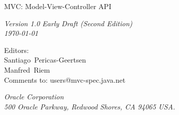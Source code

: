 \begin{titlepage}
\raggedleft

\vspace*{60pt}

{\Huge
\textsf{MVC: Model-View-Controller API}}

\vspace{20pt}

{
\Large\textit{Version 1.0 Early Draft (Second Edition)\\
\today}
}

\vspace{40pt}

{\large Editors:\\
Santiago\ Pericas-Geertsen\\
Manfred\ Riem\\
\vspace{10pt}Comments to: users@mvc-spec.java.net
}

\vspace{80pt}

{\small\textit{Oracle Corporation\\
500 Oracle Parkway, Redwood Shores, CA 94065 USA.}
}
\end{titlepage} 
